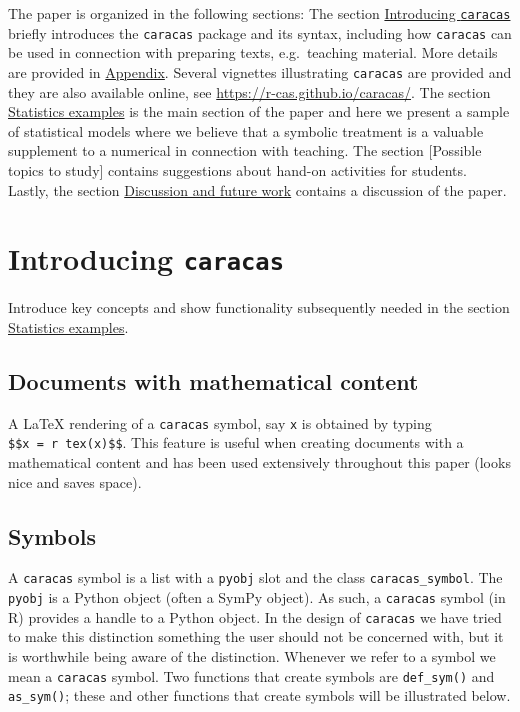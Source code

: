 The paper is organized in the following sections: The section
\protect\hyperlink{introducing-caracas}{Introducing \texttt{caracas}} briefly introduces
the \texttt{caracas} package and its syntax, including how \texttt{caracas} can be
used in connection with preparing texts, e.g.~teaching material. More
details are provided in \protect\hyperlink{appendix}{Appendix}.
Several vignettes illustrating \texttt{caracas} are provided and they are
also available online, see \url{https://r-cas.github.io/caracas/}. The
section \protect\hyperlink{statistics-examples}{Statistics examples} is the main section of the paper and
here we present a sample of statistical models where we believe that a
symbolic treatment is a valuable supplement to a numerical in
connection with teaching. The section {[}Possible topics to study{]}
contains suggestions about hand-on activities for students. Lastly,
the section \protect\hyperlink{discussion-and-future-work}{Discussion and future work} contains a discussion of the
paper.

\hypertarget{introducing-caracas}{%
\section{\texorpdfstring{Introducing \texttt{caracas}}{Introducing caracas}}\label{introducing-caracas}}

Introduce key concepts and show functionality subsequently needed in the section \protect\hyperlink{statistics-examples}{Statistics examples}.

\hypertarget{documents-with-mathematical-content}{%
\subsection{Documents with mathematical content}\label{documents-with-mathematical-content}}

A LaTeX rendering of a \texttt{caracas} symbol, say \texttt{x} is obtained by typing
\texttt{\$\$x\ =\ \textasciigrave{}r\ tex(x)\textasciigrave{}\$\$}. This feature is useful
when creating documents with a mathematical content and has been used
extensively throughout this paper (looks nice and saves space).

\hypertarget{symbols}{%
\subsection{Symbols}\label{symbols}}

A \texttt{caracas} symbol is a list with a \texttt{pyobj} slot and the class
\texttt{caracas\_symbol}. The \texttt{pyobj} is a Python object (often a SymPy
object). As such, a \texttt{caracas} symbol (in R) provides a handle to a
Python object. In the design of \texttt{caracas} we have tried to make
this distinction something the user should not be concerned with, but
it is worthwhile being aware of the distinction. Whenever we refer to
a symbol we mean a \texttt{caracas} symbol. Two functions that create
symbols are \texttt{def\_sym()} and \texttt{as\_sym()}; these and other functions that
create symbols will be illustrated below.

